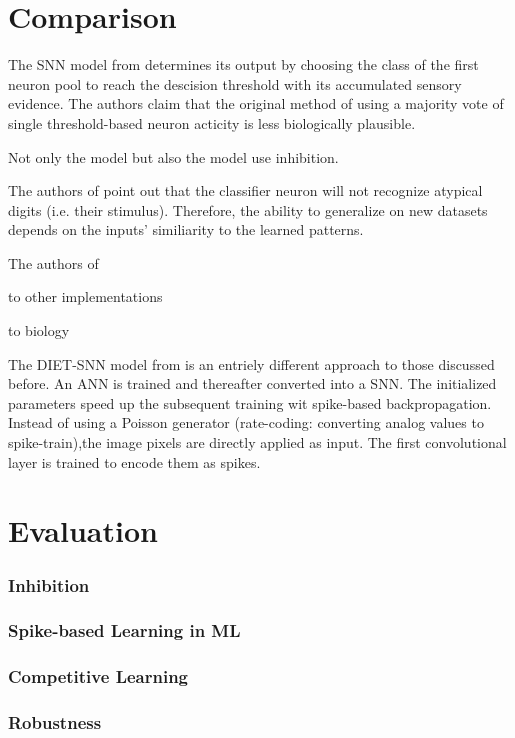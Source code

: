 \section{Comparison}
\label{sec:comparison}

The \ac{SNN} model from \cite{STDP_like} determines its output by 
choosing the class of the first neuron pool to reach the descision threshold with its accumulated sensory evidence.
The authors claim that the original method of using a majority vote of single threshold-based neuron acticity is less biologically plausible.

Not only the \cite{STDP_like} model but also the \cite{SNN} model use inhibition.

The authors of \cite{STDP_like} point out that the classifier neuron will not recognize atypical digits (i.e. their stimulus).
Therefore, the ability to generalize on new datasets depends on the inputs' similiarity to the learned patterns.

The authors of \cite{SNN} 

to other implementations

to biology

The \ac{DIET}-\ac{SNN} model from \cite{DIET_SNN} is an entriely different approach to those discussed before.
An \ac{ANN} is trained and thereafter converted into a \ac{SNN}.
The initialized parameters speed up the subsequent training wit spike-based backpropagation.
Instead of using a Poisson generator (rate-coding: converting analog values to spike-train),the image pixels are directly applied as input.
The first convolutional layer is trained to encode them as spikes.


\section{Evaluation}
\label{sec:evaluation}

\subsubsection{Inhibition}

\subsubsection{Spike-based Learning in ML}

\subsubsection{Competitive Learning}

\subsubsection{Robustness}